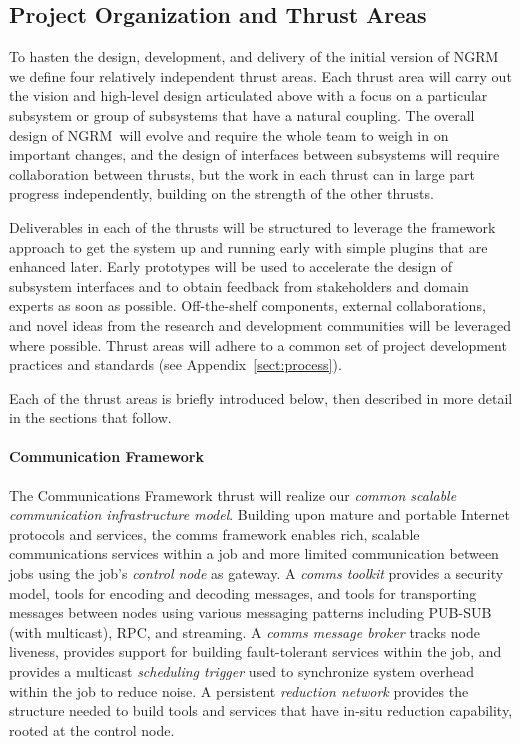 \documentclass[10pt]{article}
\newcommand{\ngrm}{NGRM}
\begin{document}
\subsection{Project Organization and Thrust Areas}
\label{sect:projorg}
To hasten the design, development, and delivery of the initial version
of \ngrm\, we define four relatively independent thrust areas.
Each thrust area will carry out the vision and high-level design articulated
above with a focus on a particular subsystem or group of subsystems that
have a natural coupling.  The overall design of \ngrm\ will evolve and
require the whole team to weigh in on important changes, and the design
of interfaces between subsystems will require collaboration between
thrusts, but the work in each thrust can in large part progress
independently, building on the strength of the other thrusts.

Deliverables in each of the thrusts will be structured 
to leverage the framework approach to get the system up and running
early with simple plugins that are enhanced later.
Early prototypes will be used to accelerate the design of subsystem
interfaces and to obtain feedback from stakeholders and domain experts
as soon as possible.
Off-the-shelf components, external collaborations, and novel ideas from
the research and development communities will be leveraged where possible.
Thrust areas will adhere to a common set of project development practices
and standards (see Appendix~\ref{sect:process}).

Each of the thrust areas is briefly introduced below, then described in
more detail in the sections that follow.

\paragraph{Communication Framework}
The Communications Framework thrust will
realize our {\em common scalable communication infrastructure model}.
Building upon mature and portable Internet protocols and services,
the comms framework enables rich, scalable communications services
within a job and more limited communication between jobs using
the job's {\em control node} as gateway.
A {\em comms toolkit} provides a security model, tools for
encoding and decoding messages, and tools for transporting messages between
nodes using various messaging patterns including PUB-SUB (with multicast),
RPC, and streaming.
A {\em comms message broker} tracks node liveness, provides support for
building fault-tolerant services within the job,
and provides a multicast {\em scheduling trigger} used to synchronize
system overhead within the job to reduce noise.
A persistent {\em reduction network}
provides the structure needed to build tools and services that have
in-situ reduction capability, rooted at the control node.
\end{document}
